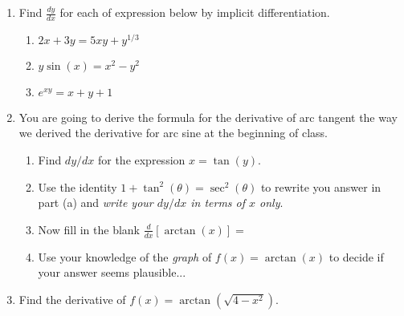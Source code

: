 \documentclass[11pt,fleqn]{article}
\begin{document}
\setlength{\parindent}{0cm}
\renewcommand{\headrulewidth}{0pt}
\newcommand{\blank}[1]{\rule{#1}{0.75pt}}
\renewcommand{\d}{\displaystyle}
\vspace*{-0.7in}
\begin{center}
 {\large{ }}
\end{center}
\begin{enumerate}
\item Find $\frac{dy}{dx}$ for each of expression below by implicit differentiation.
	\begin{enumerate}
	\item $2x+3y=5xy+y^{1/3}$
	\vfill
	\item $y\sin(x)=x^2-y^2$
	\vfill
	\item $e^{xy}=x+y+1$
	\vfill
	\end{enumerate}
\newpage

\item You are going to derive the formula for the derivative of arc tangent the way we derived the derivative for arc sine at the beginning of class. 
	\begin{enumerate}
	\item Find $dy/dx$ for the expression $x=\tan(y).$
	\vfill
	\item Use the identity $1+\tan^2(\theta)=\sec^2(\theta)$ to rewrite you answer in part (a) and \emph{write your $dy/dx$ in terms of $x$ only}.
	\vfill
	\item Now fill in the blank $\d{\frac{d}{dx}\left[ \arctan(x)\right]}=$\\
	
	\item Use your knowledge of the \emph{graph} of $f(x)=\arctan(x)$ to decide if your answer seems plausible...
	\vspace{1in}
	\end{enumerate}
	

\item Find the derivative of $f(x) = \arctan ( \sqrt{ 4-x^2}).$
\vfill
\end{enumerate}
\end{document}
